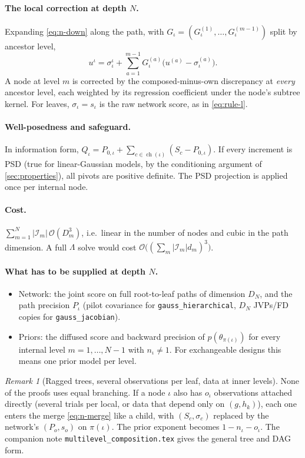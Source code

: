 \documentclass[11pt]{article}
\theoremstyle{definition}
\theoremstyle{remark}
\newtheorem{remark}{Remark}
\newcommand{\ch}{\operatorname{ch}}
\newcommand{\arrowm}{\texttt{gauss\_\allowbreak hierarchical}}
\newcommand{\quiver}{\texttt{gauss\_\allowbreak jacobian}}
\begin{document}
\paragraph{The local correction at depth $N$.} Expanding \eqref{eq:n-down} along
the path, with $G_\iota=(G^{(1)}_\iota,\dots,G^{(m-1)}_\iota)$ split by ancestor
level,
\[
u^\iota=\sigma^\iota_\iota+\sum_{a=1}^{m-1}G^{(a)}_\iota\big(u^{(a)}-\sigma^{(a)}_\iota\big).
\]
A node at level $m$ is corrected by the composed-minus-own discrepancy at
\emph{every} ancestor level, each weighted by its regression coefficient under the
node's subtree kernel. For leaves, $\sigma_\iota=s_\iota$ is the raw network score,
as in \eqref{eq:rule-l}.

\paragraph{Well-posedness and safeguard.} In information form,
$Q_\iota=P_{0,\iota}+\sum_{c\in\ch(\iota)}(S_c-P_{0,\iota})$. If every increment is
PSD (true for linear-Gaussian models, by the conditioning argument of
\cref{sec:properties}), all pivots are positive definite. The PSD projection is
applied once per internal node.

\paragraph{Cost.} $\sum_{m=1}^{N}|\mathcal{I}_m|\,\mathcal{O}(D_m^3)$, i.e.\ linear in
the number of nodes and cubic in the path dimension. A full $\Lambda$ solve would
cost $\mathcal{O}\big((\sum_m|\mathcal{I}_m|d_m)^3\big)$.

\paragraph{What has to be supplied at depth $N$.}
\begin{itemize}
\item Network: the joint score on full root-to-leaf paths of dimension $D_N$, and
 the path precision $P_\iota$ (pilot covariance for \arrowm, $D_N$ JVPs/FD copies
 for \quiver).
\item Priors: the diffused score and backward precision of $p(\theta_{\pi(\iota)})$
 for every internal level $m=1,\dots,N-1$ with $n_\iota\neq1$. For exchangeable
 designs this means one prior model per level.
\end{itemize}

\begin{remark}[Ragged trees, several observations per leaf, data at inner levels]\label{rem:ragged}
None of the proofs uses equal branching. If a node $\iota$ also has $o_\iota$
observations attached directly (several trials per local, or data that depend
only on $(g,h_k)$), each one enters the merge \eqref{eq:n-merge} like a child,
with $(S_c,\sigma_c)$ replaced by the network's $(P_o,s_o)$ on $\pi(\iota)$. The
prior exponent becomes $1-n_\iota-o_\iota$. The companion note
\texttt{multilevel\_composition.tex} gives the general tree and DAG form.
\end{remark}
\end{document}
